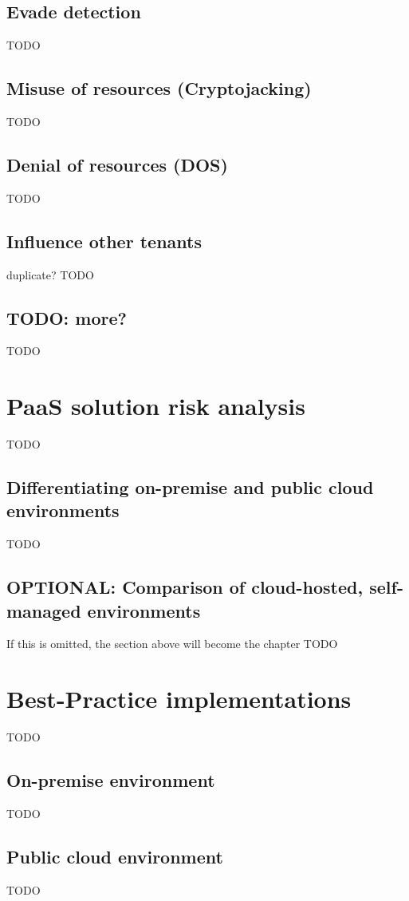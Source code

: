 \section{Evade detection}
TODO

\section{Misuse of resources (Cryptojacking)}
TODO

\section{Denial of resources (DOS)}
TODO

\section{Influence other tenants}
duplicate?
TODO

\section{TODO: more?}
TODO

\chapter{PaaS solution risk analysis}
TODO

\section{Differentiating on-premise and public cloud environments}
TODO

\section{OPTIONAL: Comparison of cloud-hosted, self-managed environments}
If this is omitted, the section above will become the chapter
TODO

\chapter{Best-Practice implementations}
TODO

\section{On-premise environment}
TODO

\section{Public cloud environment}
TODO

